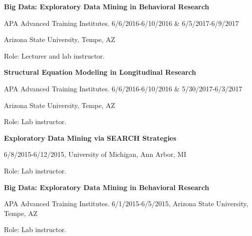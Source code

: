 \documentclass[letterpaper,10pt]{article}
\begin{document}
\begin{itemize}
%
\begin{center}
	\parbox{6.5in}{\textbf{Big Data: Exploratory Data Mining in Behavioral Research}}
	\parbox{6.5in}{APA Advanced Training Institutes. 6/6/2016-6/10/2016 \& 6/5/2017-6/9/2017 }
	\parbox{6.5in}{Arizona State University, Tempe, AZ}
	\parbox{6.5in}{Role: Lecturer and lab instructor.}
\end{center}

%
\begin{center}
	\parbox{6.5in}{\textbf{Structural Equation Modeling in Longitudinal Research}}
	\parbox{6.5in}{APA Advanced Training Institutes. 6/6/2016-6/10/2016 \& 5/30/2017-6/3/2017}
	\parbox{6.5in}{Arizona State University, Tempe, AZ}
	\parbox{6.5in}{Role: Lab instructor.}
\end{center}

%
\begin{center}
	\parbox{6.5in}{\textbf{Exploratory Data Mining via SEARCH Strategies}}
	\parbox{6.5in}{6/8/2015-6/12/2015, University of Michigan, Ann Arbor, MI}
	\parbox{6.5in}{Role: Lab instructor.}
\end{center}

%
\begin{center}
	\parbox{6.5in}{\textbf{Big Data: Exploratory Data Mining in Behavioral Research}}
	\parbox{6.5in}{APA Advanced Training Institutes. 6/1/2015-6/5/2015, Arizona State University, Tempe, AZ}
	\parbox{6.5in}{Role: Lab instructor.}
\end{center}



\end{itemize}
\end{document}
